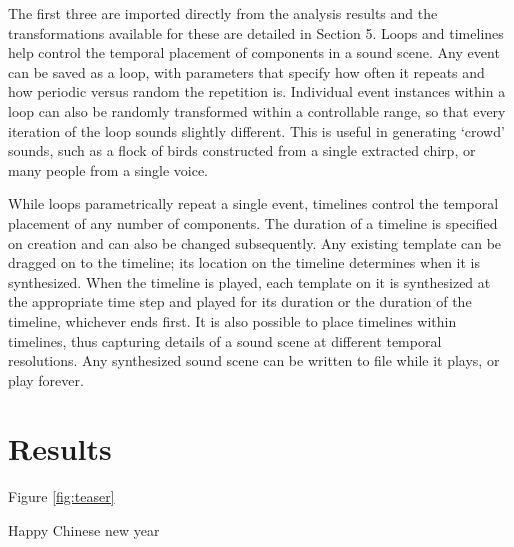 \documentclass{acmsiggraph}               %
\begin{document}
The first three are imported directly from the analysis results and the 
transformations available for these are detailed in Section 5. Loops 
and timelines help control the temporal placement of components in a 
sound scene. Any event can be saved as a loop, with parameters that 
specify how often it repeats and how periodic versus random the 
repetition is. Individual event instances within a loop can also be 
randomly transformed within a controllable range, so that every 
iteration of the loop sounds slightly different. This is useful in 
generating `crowd' sounds, such as a flock of birds constructed from a 
single extracted chirp, or many people from a single voice. 

While loops parametrically repeat a single event, timelines control the 
temporal placement of any number of components. The duration of a timeline 
is specified on creation and can also be changed subsequently. 
Any existing template can be dragged on to the timeline; its location on the 
timeline determines when it is synthesized. 
When the timeline is played, each template on it is synthesized at the appropriate 
time step and played for its duration or the duration of the timeline, whichever ends first. 
It is also possible to place 
timelines within timelines, thus capturing details of a sound scene at different 
temporal resolutions. Any synthesized sound scene can be written to file while it 
plays, or play forever.  

\section{Results}

Figure \ref{fig:teaser}

Happy Chinese new year


\end{document}

